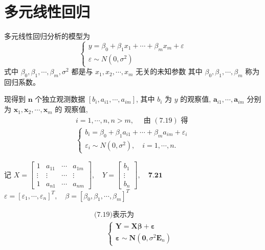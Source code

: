 \section{多元线性回归}

多元线性回归分析的模型为
$$
\left\{\begin{array}{l}
y=\beta_{0}+\beta_{1} x_{1}+\cdots+\beta_{m} x_{m}+\varepsilon \\
\varepsilon \sim N\left(0, \sigma^{2}\right)
\end{array}\right.
$$
式中 \( \beta_{0}, \beta_{1}, \cdots, \beta_{m}, \sigma^{2} \) 都是与 \( x_{1}, x_{2}, \cdots, x_{m} \) 无关的未知参数
其中 \( \beta_{0}, \beta_{1}, \cdots, \beta_{m} \) 称为回归系数。

现得到 \( \boldsymbol{n} \) 个独立观测数据 \( \left[b_{i}, a_{i 1}, \cdots, a_{i m}\right] \), 其中 \( b_{i} \) 为 \( y \) 的观察值, \( \boldsymbol{a}_{i 1}, \cdots, \boldsymbol{a}_{i m} \) 分别为 \( \boldsymbol{x}_{1}, \boldsymbol{x}_{2}, \cdots, \boldsymbol{x}_{m} \) 的 观察值,
$$
\begin{aligned}
i=1, \cdots, n, n>m, \quad \text { 由 }(7.19) \text { 得 } \\
\left\{\begin{array}{l}
b_{i}=\beta_{0}+\beta_{1} a_{i 1}+\cdots+\beta_{m} a_{i m}+\varepsilon_{i} \\
\varepsilon_{i} \sim N\left(0, \sigma^{2}\right), \quad i=1, \cdots, n .
\end{array}\right.
\end{aligned}
$$

记 \( X=\left[\begin{array}{cccc}1 & a_{11} & \cdots & a_{1 m} \\ \vdots & \vdots & \cdots & \vdots \\ 1 & a_{n 1} & \cdots & a_{n m}\end{array}\right], \quad Y=\left[\begin{array}{c}b_{1} \\ \vdots \\ b_{n}\end{array}\right], \quad \mathbf{7 . 2 1} \)
\( \varepsilon=\left[\varepsilon_{1}, \cdots, \varepsilon_{n}\right]^{T}, \quad \beta=\left[\beta_{0}, \beta_{1}, \cdots, \beta_{m}\right]^{T} \)

$$
\begin{array}{l}
\text { (7.19)表示为 } \\
\qquad\left\{\begin{array}{l}
\boldsymbol{Y}=\boldsymbol{X} \boldsymbol{\beta}+\boldsymbol{\varepsilon} \\
\boldsymbol{\varepsilon} \sim \boldsymbol{N}\left(\mathbf{0}, \sigma^{2} \boldsymbol{E}_{n}\right)
\end{array}\right.
\end{array}
$$

